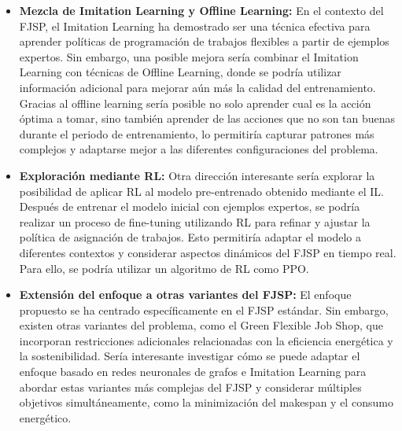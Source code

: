 \begin{itemize}
    \item \textbf{Mezcla de Imitation Learning y Offline Learning:} En 
    el contexto del FJSP, el Imitation Learning ha demostrado ser una 
    técnica efectiva para aprender políticas de programación de trabajos 
    flexibles a partir de ejemplos expertos. Sin embargo, una posible mejora 
    sería combinar el Imitation Learning con técnicas de Offline Learning, 
    donde se podría utilizar información adicional para mejorar aún más la 
    calidad del entrenamiento. Gracias al offline learning sería posible no 
    solo aprender cual es la acción óptima a tomar, sino también aprender 
    de las acciones que no son tan buenas durante el periodo de entrenamiento, 
    lo permitiría capturar patrones más complejos y adaptarse mejor a las 
    diferentes configuraciones del problema.
   \item \textbf{Exploración mediante RL:} Otra dirección interesante sería explorar 
   la posibilidad de aplicar RL al modelo pre-entrenado obtenido mediante 
   el IL. Después de entrenar el modelo inicial con ejemplos expertos, 
   se podría realizar un proceso de fine-tuning utilizando RL para refinar 
   y ajustar la política de asignación de trabajos. Esto permitiría adaptar 
   el modelo a diferentes contextos y considerar aspectos dinámicos del 
   FJSP en tiempo real. Para ello, se podría utilizar un algoritmo de
   RL como PPO.
   \item \textbf{Extensión del enfoque a otras variantes del FJSP:} El 
   enfoque propuesto se ha centrado específicamente en el FJSP estándar. 
   Sin embargo, existen otras variantes del problema, como el Green Flexible 
   Job Shop, que incorporan restricciones adicionales relacionadas con la 
   eficiencia energética y la sostenibilidad. Sería interesante investigar 
   cómo se puede adaptar el enfoque basado en redes neuronales de grafos e 
   Imitation Learning para abordar estas variantes más complejas del FJSP y 
   considerar múltiples objetivos simultáneamente, como la minimización del 
   makespan y el consumo energético.


\end{itemize}